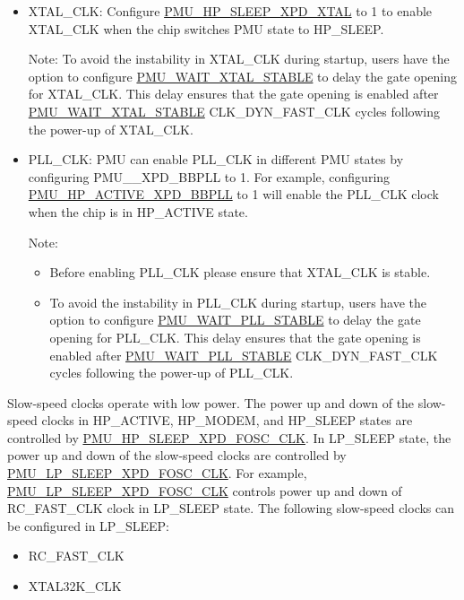 \documentclass[main\_\_EN.tex]{subfiles}
\begin{document}
\begin{itemize}
    \item XTAL\_CLK: Configure \hyperref[fielddesc:PMUHPSLEEPXPDXTAL]{PMU\_HP\_SLEEP\_XPD\_XTAL} to 1 to enable XTAL\_CLK when the chip switches PMU state to HP\_SLEEP.

    Note: To avoid the instability in XTAL\_CLK during startup, users have the option to configure \hyperref[fielddesc:PMUWAITXTALSTABLE]{PMU\_WAIT\_XTAL\_STABLE} to delay the gate opening for XTAL\_CLK. This delay ensures that the gate opening is enabled after \hyperref[fielddesc:PMUWAITXTALSTABLE]{PMU\_WAIT\_XTAL\_STABLE} CLK\_DYN\_FAST\_CLK cycles following the power-up of XTAL\_CLK.

    \item PLL\_CLK: PMU can enable PLL\_CLK in different PMU states by configuring PMU\_\_XPD\_BBPLL to 1. For example, configuring \hyperref[fielddesc:PMUHPACTIVEXPDBBPLL]{PMU\_HP\_ACTIVE\_XPD\_BBPLL} to 1 will enable the PLL\_CLK clock when the chip is in HP\_ACTIVE state.

    Note:
    \begin{itemize}
        \item Before enabling PLL\_CLK please ensure that XTAL\_CLK is stable.
        \item To avoid the instability in PLL\_CLK during startup, users have the option to configure \hyperref[fielddesc:PMUWAITPLLSTABLE]{PMU\_WAIT\_PLL\_STABLE} to delay the gate opening for PLL\_CLK. This delay ensures that the gate opening is enabled after \hyperref[fielddesc:PMUWAITPLLSTABLE]{PMU\_WAIT\_PLL\_STABLE} CLK\_DYN\_FAST\_CLK cycles following the power-up of PLL\_CLK.
    \end{itemize}
\end{itemize}

Slow-speed clocks operate with low power. The power up and down of the slow-speed clocks in HP\_ACTIVE, HP\_MODEM, and HP\_SLEEP states are controlled by \hyperref[fielddesc:PMUHPSLEEPXPDFOSCCLK]{PMU\_HP\_SLEEP\_XPD\_FOSC\_CLK}. In LP\_SLEEP state, the power up and down of the slow-speed clocks are controlled by \hyperref[fielddesc:PMULPSLEEPXPDFOSCCLK]{PMU\_LP\_SLEEP\_XPD\_FOSC\_CLK}. For example, \hyperref[fielddesc:PMULPSLEEPXPDFOSCCLK]{PMU\_LP\_SLEEP\_XPD\_FOSC\_CLK} controls power up and down of RC\_FAST\_CLK clock in LP\_SLEEP state. The following slow-speed clocks can be configured in LP\_SLEEP:

\begin{itemize}
\item RC\_FAST\_CLK
\item XTAL32K\_CLK
\end{itemize}
\end{document}
